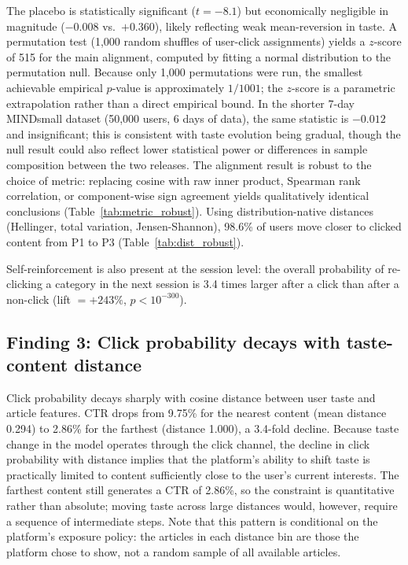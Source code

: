 \documentclass[11pt]{article}
\begin{document}
The placebo is statistically significant ($t = -8.1$) but economically negligible in magnitude ($-0.008$ vs.\ $+0.360$), likely reflecting weak mean-reversion in taste. A permutation test (1,000 random shuffles of user-click assignments) yields a $z$-score of 515 for the main alignment, computed by fitting a normal distribution to the permutation null. Because only 1,000 permutations were run, the smallest achievable empirical $p$-value is approximately $1/1001$; the $z$-score is a parametric extrapolation rather than a direct empirical bound. In the shorter 7-day MINDsmall dataset (50,000 users, 6 days of data), the same statistic is $-0.012$ and insignificant; this is consistent with taste evolution being gradual, though the null result could also reflect lower statistical power or differences in sample composition between the two releases. The alignment result is robust to the choice of metric: replacing cosine with raw inner product, Spearman rank correlation, or component-wise sign agreement yields qualitatively identical conclusions (Table~\ref{tab:metric_robust}). Using distribution-native distances (Hellinger, total variation, Jensen-Shannon), 98.6\% of users move closer to clicked content from P1 to P3 (Table~\ref{tab:dist_robust}).

Self-reinforcement is also present at the session level: the overall probability of re-clicking a category in the next session is 3.4 times larger after a click than after a non-click (lift $= +243\%$, $p < 10^{-300}$).

\subsection{Finding 3: Click probability decays with taste-content distance}

Click probability decays sharply with cosine distance between user taste and article features. CTR drops from 9.75\% for the nearest content (mean distance 0.294) to 2.86\% for the farthest (distance 1.000), a 3.4-fold decline. Because taste change in the model operates through the click channel, the decline in click probability with distance implies that the platform's ability to shift taste is practically limited to content sufficiently close to the user's current interests. The farthest content still generates a CTR of 2.86\%, so the constraint is quantitative rather than absolute; moving taste across large distances would, however, require a sequence of intermediate steps. Note that this pattern is conditional on the platform's exposure policy: the articles in each distance bin are those the platform chose to show, not a random sample of all available articles.
\end{document}
